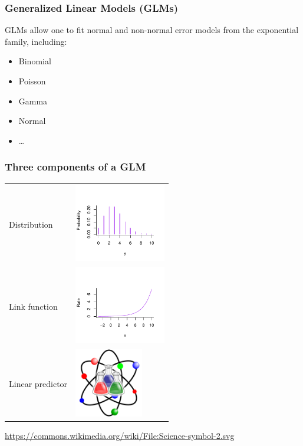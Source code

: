 \documentclass[dvipsnames]{beamer}
\begin{document}
\begin{frame}
 \frametitle{Generalized Linear Models (GLMs)}
GLMs allow one to fit normal and non-normal error models from the exponential family, including:
\begin{itemize}
 \item Binomial
 \item Poisson
 \item Gamma
 \item Normal
 \item \dots
\end{itemize}

\end{frame}

\begin{frame}
 \frametitle{Three components of a GLM}
 \begin{center}
\begin{tabular}{ll}
Distribution & \begin{minipage}[c][2cm][c]{.2\textwidth}  \includegraphics[width=4cm]{figures/distribution.pdf}\end{minipage}\\
Link function & \begin{minipage}[c][2cm][c]{.2\textwidth}  \includegraphics[width=4cm]{figures/link_function.pdf}\end{minipage}\\
Linear predictor & \begin{minipage}[c][4cm][c]{.2\textwidth}  \includegraphics[width=3cm]{figures/Science-symbol-2.svg.png}\end{minipage}
 \end{tabular}
 \end{center}
\tiny{\url{https://commons.wikimedia.org/wiki/File:Science-symbol-2.svg}}
\end{frame}
\end{document}
